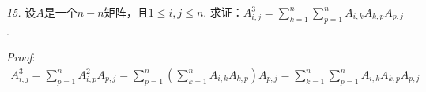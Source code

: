 \hspace*{\fill}

\textit{15.}
设$A$是一个$n-n$矩阵，且$1 \leq i,j \leq n$.
求证：$A^3_{i,j}=\sum_{k=1}^n \sum_{p=1}^n A_{i,k}A_{k,p}A_{p,j}$.

\textit{Proof}:
    \begin{align*}
        A^3_{i,j}=\sum_{p=1}^n A^2_{i,p}A_{p,j}
        =\sum_{p=1}^n (\sum_{k=1}^n A_{i,k}A_{k,p})A_{p,j}
        =\sum_{k=1}^n \sum_{p=1}^n A_{i,k}A_{k,p}A_{p,j}
    \end{align*}